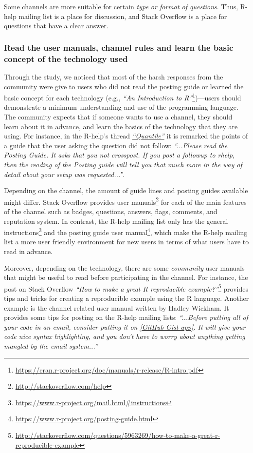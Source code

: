 \documentclass{sig-alternate-05-2015}
\begin{document}
		Some channels are more suitable for certain \emph{type or format of questions}. 
		Thus, R-help mailing list is a place for discussion, and Stack Overflow is a place for questions that have a clear answer.


	\subsubsection{Read the user manuals, channel rules and learn the basic concept of the technology used}

		Through the study, we noticed that most of the harsh responses from the community were give to users who did not read the posting guide or learned the basic concept for each technology (e.g., \textit{``An Introduction to R''}\footnote{\url{https://cran.r-project.org/doc/manuals/r-release/R-intro.pdf}})---users should demonstrate a minimum understanding and use of the programming language.
		The community expects that if someone wants to use a channel, they should learn about it in advance, and learn the basics of the technology that they are using.
		For instance, in the R-help's thread \textit{\href{http://goo.gl/Dc8gXw}{``Quantile''}} it is remarked the points of a guide that the user asking the question did not follow: \textit{``...Please read the Posting Guide. It asks that you not crosspost. If you post a followup to rhelp, then the reading of the Posting guide will tell you that much more in the way of detail about your setup was requested...''}.

		Depending on the channel, the amount of guide lines and posting guides available might differ. 
		Stack Overflow provides user manuals\footnote{\url{http://stackoverflow.com/help}} for each of the main features of the channel such as badges, questions, answers, flags, comments, and reputation system.
		In contrast, the R-help mailing list only has the general instructions\footnote{\url{https://www.r-project.org/mail.html\#instructions}} and the posting guide user manual\footnote{\url{https://www.r-project.org/posting-guide.html}}, which make the R-help mailing list a more user friendly environment for new users in terms of what users have to read in advance.

		Moreover, depending on the technology, there are some \textit{community} user manuals that might be useful to read before participating in the channel.
		For instance, the post on Stack Overflow \textit{``How to make a great R reproducible example?''}\footnote{\url{http://stackoverflow.com/questions/5963269/how-to-make-a-great-r-reproducible-example}} provides tips and tricks for creating a reproducible example using the R language.
	 	Another example is the channel related user manual written by Hadley Wickham.
	 	It provides some tips for posting on the R-help mailing lists: \textit{``...Before putting all of your code in an email, consider putting it on \href{http://gist.github.com/}{[GitHub Gist app]}. It will give your code nice syntax highlighting, and you don't have to worry about anything getting mangled by the email system...''}
\end{document}
